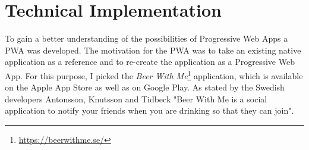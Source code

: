 \section{Technical Implementation}
To gain a better understanding of the possibilities of Progressive Web Apps a PWA was developed. The motivation for the PWA was to take an existing native application as a reference and to re-create the application as a Progressive Web App. For this purpose, I picked the \textit{Beer With Me}\footnote{\url{https://beerwithme.se/}} application, which is available on the Apple App Store as well as on Google Play. As stated by the Swedish developers Antonsson, Knutsson and Tidbeck "Beer With Me is a social application to notify your friends when you are drinking so that they can join".
